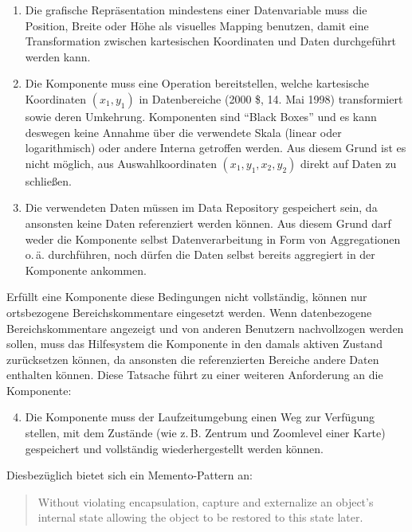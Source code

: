 \documentclass[
	headsepline,
	footsepline,
	fontsize=12pt,
	bibliography=totoc
]{scrbook}
\begin{document}
\begin{enumerate}
	\item Die grafische Repräsentation mindestens einer Datenvariable muss die Position, Breite oder Höhe als visuelles Mapping benutzen, damit eine Transformation zwischen kartesischen Koordinaten und Daten durchgeführt werden kann.
	\item Die Komponente muss eine Operation bereitstellen, welche kartesische Koordinaten $(x_1,y_1)$ in Datenbereiche (2000 \$, 14. Mai 1998) transformiert sowie deren Umkehrung. Komponenten sind \enquote{Black Boxes} und es kann deswegen keine Annahme über die verwendete Skala (linear oder logarithmisch) oder andere Interna getroffen werden. Aus diesem Grund ist es nicht möglich, aus Auswahlkoordinaten $(x_1,y_1,x_2,y_2)$ direkt auf Daten zu schließen.
	\item Die verwendeten Daten müssen im Data Repository gespeichert sein, da ansonsten keine Daten referenziert werden können. Aus diesem Grund darf weder die Komponente selbst Datenverarbeitung in Form von Aggregationen o.\,ä. durchführen, noch dürfen die Daten selbst bereits aggregiert in der Komponente ankommen.
\end{enumerate}

Erfüllt eine Komponente diese Bedingungen nicht vollständig, können nur ortsbezogene Bereichskommentare eingesetzt werden. Wenn datenbezogene Bereichskommentare angezeigt und von anderen Benutzern nachvollzogen werden sollen, muss das Hilfesystem die Komponente in den damals aktiven Zustand zurücksetzen können, da ansonsten die referenzierten Bereiche andere Daten enthalten können. Diese Tatsache führt zu einer weiteren Anforderung an die Komponente:

\begin{enumerate}
	\setcounter{enumi}{3}
	\item Die Komponente muss der Laufzeitumgebung einen Weg zur Verfügung stellen, mit dem Zustände (wie z.\,B. Zentrum und Zoomlevel einer Karte) gespeichert und vollständig wiederhergestellt werden können.
\end{enumerate}

Diesbezüglich bietet sich ein Memento-Pattern \cite{Gamma1994} an:

\begin{quote}
Without violating encapsulation, capture and externalize an object's internal state allowing the object to be restored to this state later.
\end{quote} 
\end{document}
